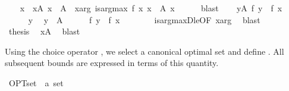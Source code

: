 \begin{isabellebody}
\ \ \isamarkupfalse%
\ x\ \ xA{\isacharcolon}{\kern0pt}\ {\isachardoublequoteopen}x\ {\isasymin}\ A{\isachardoublequoteclose}\ \ xarg{\isacharcolon}{\kern0pt}\ {\isachardoublequoteopen}is{\isacharunderscore}{\kern0pt}arg{\isacharunderscore}{\kern0pt}max\ f\ {\isacharparenleft}{\kern0pt}{\isasymlambda}x{\isachardot}{\kern0pt}\ x\ {\isasymin}\ A{\isacharparenright}{\kern0pt}\ x{\isachardoublequoteclose}\isanewline
\ \ \ \ \isamarkupfalse%
\ blast\isanewline
\ \ \isamarkupfalse%
\ {\isachardoublequoteopen}{\isasymforall}y{\isasymin}A{\isachardot}{\kern0pt}\ f\ y\ {\isasymle}\ f\ x{\isachardoublequoteclose}\isanewline
\ \ \isamarkupfalse%
\isanewline
\ \ \ \ \isamarkupfalse%
\ y\ \isamarkupfalse%
\ {\isachardoublequoteopen}y\ {\isasymin}\ A{\isachardoublequoteclose}\isanewline
\ \ \ \ \isamarkupfalse%
\ {\isachardoublequoteopen}f\ y\ {\isasymle}\ f\ x{\isachardoublequoteclose}\isanewline
\ \ \ \ \ \ \isamarkupfalse%
\ is{\isacharunderscore}{\kern0pt}arg{\isacharunderscore}{\kern0pt}maxD{\isacharunderscore}{\kern0pt}le{\isacharbrackleft}{\kern0pt}OF\ xarg{\isacharbrackright}{\kern0pt}\ \isamarkupfalse%
\ blast\isanewline
\ \ \isamarkupfalse%
\isanewline
\ \ \isamarkupfalse%
\ {\isacharquery}{\kern0pt}thesis\ \isamarkupfalse%
\ xA\ \isamarkupfalse%
\ blast\isanewline
{}\isamarkupfalse%
%
\endisatagproof
{\isafoldproof}%
%
\isadelimproof
%
\endisadelimproof
%
\isadelimdocument
%
\endisadelimdocument
%
\isatagdocument
%
\isamarkuptrue%
%
\endisatagdocument
{\isafolddocument}%
%
\isadelimdocument
%
\endisadelimdocument
%
\begin{isamarkuptext}%
Using the choice operator , we select a canonical optimal set
   and define . All subsequent bounds
  are expressed in terms of this quantity.%
\end{isamarkuptext}\isamarkuptrue%
\isamarkupfalse%
\ OPT{\isacharunderscore}{\kern0pt}set\ {\isacharcolon}{\kern0pt}{\isacharcolon}{\kern0pt}\ {\isachardoublequoteopen}{\isacharprime}{\kern0pt}a\ set{\isachardoublequoteclose}\ \isanewline

\end{isabellebody}
